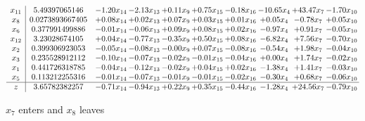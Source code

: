 \documentclass[9pt]{article}
\begin{document}
 \[\begin{array}{c| c c@{\hskip 2pt} c@{\hskip 2pt} c@{\hskip 2pt} c@{\hskip 2pt} c@{\hskip 2pt} c@{\hskip 2pt} c@{\hskip 2pt} c@{\hskip 2pt} }
 x_{11}   &  5.49397065146 & -1.20 x_{14} & -2.13 x_{13} & +  0.11 x_{9} & +  0.75 x_{15} & -0.18 x_{16} & -10.65 x_{4} & + 43.47 x_{7} & -1.70 x_{10}\\
 x_{8}   &  0.0273893667405 & +  0.08 x_{14} & +  0.02 x_{13} & +  0.07 x_{9} & +  0.03 x_{15} & +  0.01 x_{16} & +  0.05 x_{4} & -0.78 x_{7} & +  0.05 x_{10}\\
 x_{6}   &  0.377991499886 & -0.01 x_{14} & -0.06 x_{13} & +  0.09 x_{9} & +  0.08 x_{15} & +  0.02 x_{16} & -0.97 x_{4} & +  0.91 x_{7} & -0.05 x_{10}\\
 x_{12}   &  3.23028674105 & +  0.04 x_{14} & -0.77 x_{13} & -0.35 x_{9} & +  0.50 x_{15} & +  0.08 x_{16} & -6.82 x_{4} & +  7.56 x_{7} & -0.70 x_{10}\\
 x_{2}   &  0.399306923053 & -0.05 x_{14} & -0.08 x_{13} & -0.00 x_{9} & +  0.07 x_{15} & -0.08 x_{16} & -0.54 x_{4} & +  1.98 x_{7} & -0.04 x_{10}\\
 x_{3}   &  0.235528912112 & -0.10 x_{14} & -0.07 x_{13} & -0.02 x_{9} & -0.01 x_{15} & -0.04 x_{16} & +  0.00 x_{4} & +  1.74 x_{7} & -0.02 x_{10}\\
 x_{1}   &  0.441726318785 & -0.04 x_{14} & -0.12 x_{13} & -0.02 x_{9} & +  0.04 x_{15} & +  0.02 x_{16} & -1.38 x_{4} & +  1.41 x_{7} & -0.03 x_{10}\\
 x_{5}   &  0.113212255316 & -0.01 x_{14} & -0.07 x_{13} & -0.01 x_{9} & -0.01 x_{15} & -0.02 x_{16} & -0.30 x_{4} & +  0.68 x_{7} & -0.06 x_{10}\\
\hline
z    &  3.65782382257 & -0.71 x_{14} & -0.94 x_{13} & +  0.22 x_{9} & +  0.35 x_{15} & -0.44 x_{16} & -1.28 x_{4} & + 24.56 x_{7} & -0.79 x_{10}\\
\end{array}\]


 $ x_{7} $ enters and $ x_{8} $ leaves 
\end{document}
